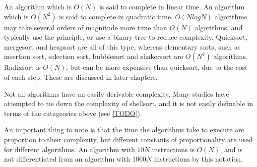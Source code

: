 An algorithm which is $O(N)$ is said to complete in linear time. An algorithm
which is $O(N^2)$ is said to complete in quadratic time.  $O(NlogN)$ algorithms
may take several orders of magnitude more time than $O(N)$ algorithms, and
typically use the  principle, or use a binary tree to
reduce complexity. Quicksort, mergesort and heapsort are all of this type,
whereas elementary sorts, such as insertion sort, selection sort, bubblesort and
shakersort are $O(N^2)$ algorithms. Radixsort is $O(N)$, but can be more
expensive than quicksort, due to the cost of each step. These are discussed in
later chapters.

Not all algorithms have an easily derivable complexity. Many studies have
attempted to tie down the complexity of shellsort, and it is not easily
definable in terms of the catageories above (see \ref{TODO}).

An important thing to note is that the time the algorithms take to execute are
proportion to their complexity, but different constants of proportionality are
used for different algorithms. An algorithm with $10N$ instructions is $O(N)$,
and is not differentiated from an algorithm with $1000N$ instructions by this
notation.

